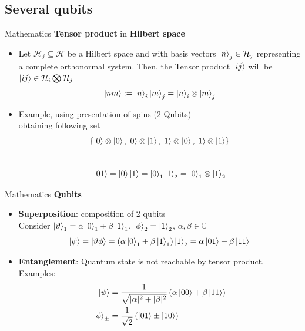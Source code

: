 \documentclass{beamer}
\begin{document}
\subsection{Several qubits}
\begin{frame}{Mathematics}
\textbf{Tensor product} in \textbf{Hilbert space}
	\begin{itemize}
    	\item Let $\mathcal{H}_j \subseteq \mathcal{H}$ be a Hilbert space and with basis vectors $\ket{n}_j \in \mathcal{H}_j$ representing a complete orthonormal system. Then, the Tensor product $\ket{ij}$ will be $\ket{ij}\in \mathcal{H}_i \bigotimes \mathcal{H}_j$
        \begin{equation}
     \ket{nm} := \ket{n}_i\ket{m}_j = \ket{n}_i\otimes\ket{m}_j  
        \end{equation}
        \item Example, using presentation of spins (2 Qubits)\\
        obtaining following set
\[ \lbrace\ket{0}\otimes\ket{0},\ket{0}\otimes\ket{1},\ket{1}\otimes\ket{0},\ket{1}\otimes\ket{1}\rbrace \]\\
\[\ket{01} = \ket{0}\ket{1}=\ket{0}_1\ket{1}_2=\ket{0}_1\otimes\ket{1}_2\]
    \end{itemize}
\end{frame}

\begin{frame}{Mathematics}
\textbf{Qubits}
	\begin{itemize}
    	\item \textbf{Superposition}: composition of 2 qubits\\
Consider $\ket{\vartheta}_1 = \alpha\ket{0}_1+\beta\ket{1}_1$, $\ket{\phi}_2 = \ket{1}_2$, $\alpha,\beta \in \mathbb{C}$ \\
\[\ket{\psi} = \ket{\vartheta\phi} = \left(\alpha\ket{0}_1+\beta\ket{1}_1\right)\ket{1}_2 =  \alpha\ket{01} + \beta\ket{11}  \]
		\item \textbf{Entanglement}: Quantum state is not reachable by tensor product. Examples:
		\begin{equation}\begin{split} \ket{\psi} & =  \frac{1}{\sqrt{|\alpha|^2+|\beta|^2}}\left(\alpha\ket{00} + \beta\ket{11}\right)   \\
\ket{\phi}_{\pm} & = \frac{1}{\sqrt{2}}\left(\ket{01}\pm\ket{10}\right)  
		\end{split}\end{equation}
    \end{itemize}
\end{frame}
\end{document}

